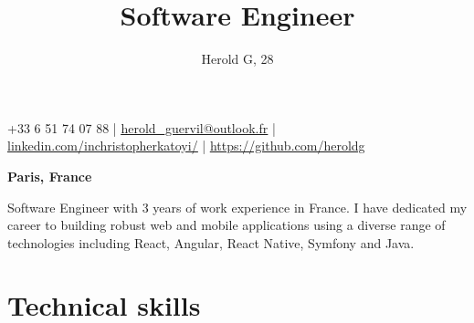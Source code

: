 \documentclass{article}
\title{Software  Engineer}
\author{Herold G, 28}
\date{}
\begin{document}
\maketitle
\thispagestyle{empty} %
\vspace{-4em}

\begin{center}
+33 6 51 74 07 88 | \href{mailto:herold_guervil@outlook.fr}{\underline{herold_guervil@outlook.fr}} | \href{https://www.linkedin.com/in/herold-guervil-a513a218a/}{\underline{linkedin.com/inchristopherkatoyi/}} | \href{https://github.com/heroldg}{\underline{https://github.com/heroldg}}
\end{center}
\begin{center}
\textbf{Paris, France}
\end{center}


\begin{center}
Software Engineer with 3 years of work experience in France. I have dedicated my career to building robust web and mobile applications using a diverse range of technologies including React, Angular, React Native, Symfony and Java.
\end{center}

\section*{Technical skills}
\end{document}
